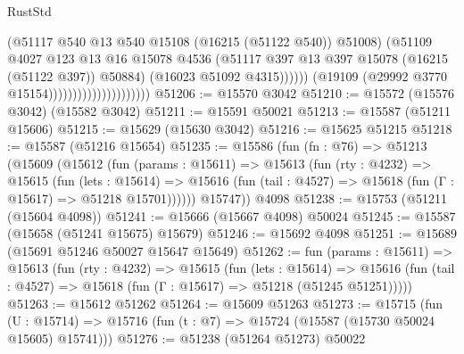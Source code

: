 \begin{lexlean}{RustStd}
\begin{coremodule}
                                                  (@51117
                                                    @540
                                                    @13
                                                    @540
                                                    @15108
                                                    (@16215 (@51122 @540))
                                                    @51008)
                                                  (@51109
                                                    @4027
                                                    @123
                                                    @13
                                                    @16
                                                    @15078
                                                    @4536
                                                    (@51117
                                                      @397
                                                      @13
                                                      @397
                                                      @15078
                                                      (@16215 (@51122 @397))
                                                      @50884)
                                                    (@16023 @51092 @4315))))))
                                          (@19109 (@29992 @3770 @15154)))))))))))))))))))))
@51206 := @15570 @3042
@51210 := @15572 (@15576 @3042) (@15582 @3042)
@51211 := @15591 @50021
@51213 := @15587 (@51211 @15606)
@51215 := @15629 (@15630 @3042)
@51216 := @15625 @51215
@51218 := @15587 (@51216 @15654)
@51235 := @15586
    (fun (fn : @76) =>
    @51213
      (@15609
        (@15612
          (fun (params : @15611) =>
          @15613
            (fun (rty : @4232) =>
            @15615
              (fun (lets : @15614) =>
              @15616 (fun (tail : @4527) => @15618 (fun (Γ : @15617) => @51218 @15701))))))
        @15747))
    @4098
@51238 := @15753 (@51211 (@15604 @4098))
@51241 := @15666 (@15667 @4098) @50024
@51245 := @15587 (@15658 (@51241 @15675) @15679)
@51246 := @15692 @4098
@51251 := @15689 (@15691 @51246 @50027 @15647 @15649)
@51262 := fun (params : @15611) =>
  @15613
    (fun (rty : @4232) =>
    @15615
      (fun (lets : @15614) =>
      @15616 (fun (tail : @4527) => @15618 (fun (Γ : @15617) => @51218 (@51245 @51251)))))
@51263 := @15612 @51262
@51264 := @15609 @51263
@51273 := @15715
    (fun (U : @15714) => @15716 (fun (t : @7) => @15724 (@15587 (@15730 @50024 @15605) @15741)))
@51276 := @51238 (@51264 @51273) @50022

\end{coremodule}
\end{lexlean}
